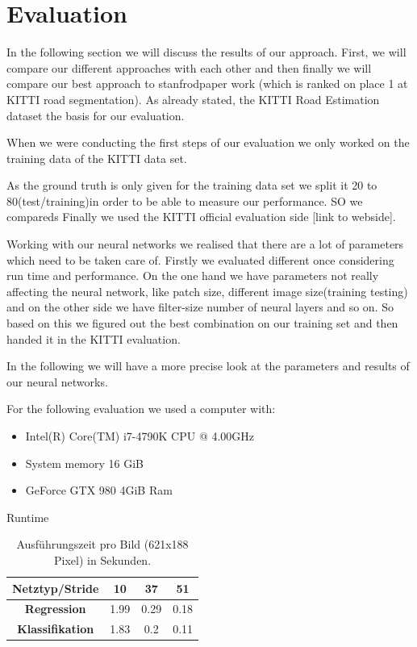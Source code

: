 
\section{Evaluation}\label{sec:evaluation}

In the following section we will discuss the results of our approach. First, we will compare our different approaches with each other and then finally we will compare our best approach to stanfrodpaper work (which is ranked on place 1 at KITTI road segmentation).
As already stated, the KITTI Road Estimation dataset the basis for our evaluation.

When we were conducting the first steps of our evaluation we only worked on the training data of the KITTI data set.

As the ground truth is only given for the training data set we split it 20 to 80(test/training)in order to be able to measure our performance. SO we compareds
Finally we used the KITTI official evaluation side [link to webside].

Working with our neural networks we realised that there are a lot of parameters which need to be taken care of. Firstly we evaluated different once considering run time and performance.
On the one hand we have parameters not really affecting the neural network, like patch size, different image size(training testing) and on the other side we have filter-size number of neural layers and so on.
So based on this we figured out the best combination on our training set and then handed it in the KITTI evaluation.

In the following we will have a more precise look at the parameters and results of our neural networks.

For the following evaluation we used a computer with:
\begin{itemize}
\item Intel(R) Core(TM) i7-4790K CPU @ 4.00GHz
\item System memory 16 GiB
\item GeForce GTX 980 4GiB Ram
\end{itemize}

Runtime
      \begin{table}[h!]
  \begin{center}
    \begin{tabular}{c|ccc}
    \toprule
      \textbf{Netztyp/Stride} & \textbf{10} & \textbf{37} & \textbf{51} \\
     \midrule
      \textbf{Regression} & 1.99 & 0.29 & 0.18 \\
      \textbf{Klassifikation} & 1.83 & 0.2 & 0.11\\
      \bottomrule
    \end{tabular}
        \caption{Ausf\"uhrungszeit pro Bild (621x188 Pixel) in Sekunden.}
  \end{center}
\end{table}

